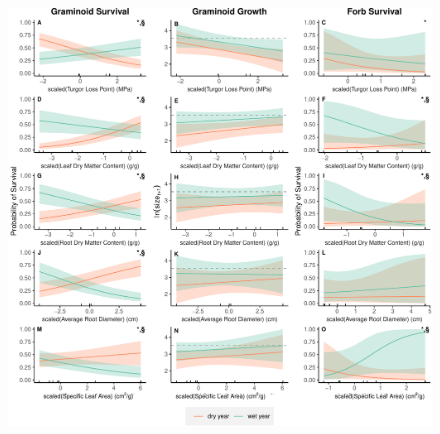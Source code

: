 \documentclass[12pt, letterpaper]{article}
\begin{document}
\begin{figure}
\captionsetup{labelformat=empty}
\includegraphics[width=1\textwidth]{mainObservationsFig-1.pdf}
\caption{}
\label{fig:PredsObs}
\end{figure}
\clearpage
\end{document}
